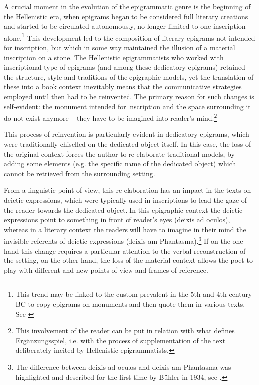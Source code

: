 \documentclass[amsthm,ebook]{saparticle}
\begin{document}
A crucial moment in the evolution of the epigrammatic genre is the beginning of the Hellenistic era, when epigrams
began to be considered full literary creations and started to be circulated autonomously, no longer limited to one
inscription alone.\footnote{ This trend may be linked to the custom prevalent in the 5th and 4th century BC to copy
epigrams on monuments and then quote them in various texts. See \citep[47ff.]{gutzwiller_poetic_1998}} This development led to the
composition of literary epigrams not intended for inscription, but which in some way maintained the illusion of a
material inscription on a stone. The Hellenistic epigrammatists who worked with inscriptional type of epigrams (and
among these dedicatory epigrams) retained the structure, style and traditions of the epigraphic models, yet the
translation of these into a book context inevitably means that the communicative strategies employed until then had to
be reinvented. The primary reason for such changes is self-evident: the monument intended for inscription and the space
surrounding it do not exist anymore – they have to be imagined into reader's mind.\footnote{ This involvement of the
reader can be put in relation with what 
defines Ergänzungsspiel, i.e. with the process of supplementation
of the text deliberately incited by Hellenistic epigrammatists.}

This process of reinvention is particularly evident in dedicatory epigrams, which were traditionally chiselled on the
dedicated object itself. In this case, the loss of the original context forces the author to re-elaborate traditional
models, by adding some elements (e.g. the specific name of the dedicated object) which cannot be retrieved from the
surrounding setting. 

From a linguistic point of view, this re-elaboration has an impact in the texts on deictic expressions, which were
typically used in inscriptions to lead the gaze of the reader towards the dedicated object. In this epigraphic context
the deictic expressions point to something in front of reader's eyes (deixis ad oculos), whereas in a literary context
the readers will have to imagine in their mind the invisible referents of deictic expressions (deixis am
Phantasma).\footnote{ The difference between deixis ad oculos and deixis am Phantasma was highlighted and described for
the first time by Bühler in 1934, see \citet[121-126, 133-135]{buhler_sprachtheorie:_1982}.} If on the one hand this change requires a
particular attention to the verbal reconstruction of the setting, on the other hand, the loss of the material context
allows the poet to play with different and new points of view and frames of reference. 
\end{document}

